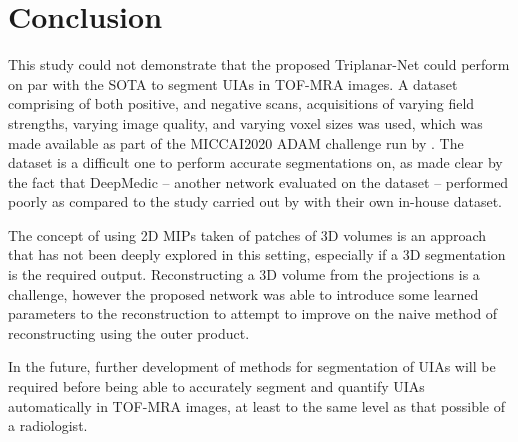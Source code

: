 \chapter{Conclusion}
\label{chapter8}
This study could not demonstrate that the proposed Triplanar-Net could perform on par with the SOTA to segment UIAs in TOF-MRA images. A dataset comprising of both positive, and negative scans, acquisitions of varying field strengths, varying image quality, and varying voxel sizes was used, which was made available as part of the MICCAI2020 ADAM challenge run by \citeauthor{Timmins2020}. The dataset is a difficult one to perform accurate segmentations on, as made clear by the fact that DeepMedic -- another network evaluated on the dataset -- performed poorly as compared to the study carried out by \citeauthor{Sichermann2019} with their own in-house dataset. 

The concept of using 2D MIPs taken of patches of 3D volumes is an approach that has not been deeply explored in this setting, especially if a 3D segmentation is the required output. Reconstructing a 3D volume from the projections is a challenge, however the proposed network was able to introduce some learned parameters to the reconstruction to attempt to improve on the naive method of reconstructing using the outer product. 

In the future, further development of methods for segmentation of UIAs will be required before being able to accurately segment and quantify UIAs automatically in TOF-MRA images, at least to the same level as that possible of a radiologist.

